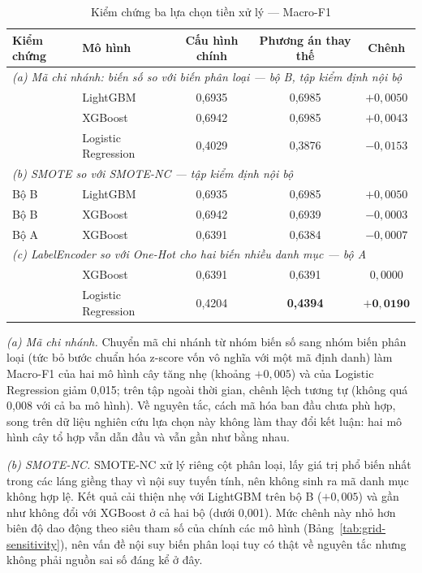 \begin{table}[H]
\centering
\caption{Kiểm chứng ba lựa chọn tiền xử lý --- Macro-F1}
\label{tab:preprocess-sensitivity}
\begin{tabular}{|l|l|c|c|c|}
\hline
\textbf{Kiểm chứng} & \textbf{Mô hình} & \textbf{Cấu hình chính} & \textbf{Phương án thay thế} & \textbf{Chênh}\\
\hline
\multicolumn{5}{|l|}{\textit{(a) Mã chi nhánh: biến số so với biến phân loại --- bộ B, tập kiểm định nội bộ}}\\
\hline
 & LightGBM & 0,6935 & 0,6985 & $+0,0050$\\
 & XGBoost & 0,6942 & 0,6985 & $+0,0043$\\
 & Logistic Regression & 0,4029 & 0,3876 & $-0,0153$\\
\hline
\multicolumn{5}{|l|}{\textit{(b) SMOTE so với SMOTE-NC --- tập kiểm định nội bộ}}\\
\hline
Bộ B & LightGBM & 0,6935 & 0,6985 & $+0,0050$\\
Bộ B & XGBoost & 0,6942 & 0,6939 & $-0,0003$\\
Bộ A & XGBoost & 0,6391 & 0,6384 & $-0,0007$\\
\hline
\multicolumn{5}{|l|}{\textit{(c) LabelEncoder so với One-Hot cho hai biến nhiều danh mục --- bộ A}}\\
\hline
 & XGBoost & 0,6391 & 0,6391 & $0,0000$\\
 & Logistic Regression & 0,4204 & \textbf{0,4394} & $\mathbf{+0,0190}$\\
\hline
\end{tabular}
\end{table}

\noindent\textit{(a) Mã chi nhánh.} Chuyển mã chi nhánh từ nhóm biến số sang nhóm biến phân loại (tức bỏ bước chuẩn hóa z-score vốn vô nghĩa với một mã định danh) làm Macro-F1 của hai mô hình cây tăng nhẹ (khoảng $+0,005$) và của Logistic Regression giảm 0,015; trên tập ngoài thời gian, chênh lệch tương tự (không quá 0,008 với cả ba mô hình). Về nguyên tắc, cách mã hóa ban đầu chưa phù hợp, song trên dữ liệu nghiên cứu lựa chọn này không làm thay đổi kết luận: hai mô hình cây tổ hợp vẫn dẫn đầu và vẫn gần như bằng nhau.

\noindent\textit{(b) SMOTE-NC.} SMOTE-NC xử lý riêng cột phân loại, lấy giá trị phổ biến nhất trong các láng giềng thay vì nội suy tuyến tính, nên không sinh ra mã danh mục không hợp lệ. Kết quả cải thiện nhẹ với LightGBM trên bộ B ($+0,005$) và gần như không đổi với XGBoost ở cả hai bộ (dưới 0,001). Mức chênh này nhỏ hơn biên độ dao động theo siêu tham số của chính các mô hình (Bảng~\ref{tab:grid-sensitivity}), nên vấn đề nội suy biến phân loại tuy có thật về nguyên tắc nhưng không phải nguồn sai số đáng kể ở đây.

